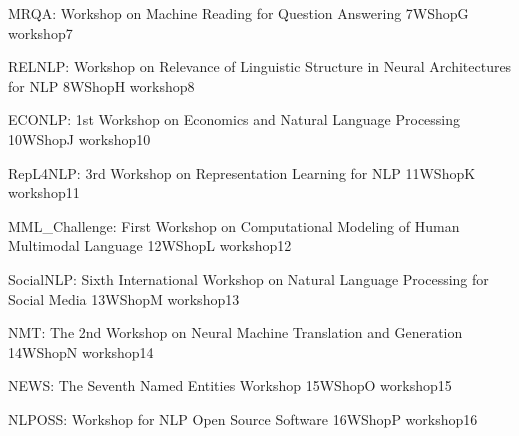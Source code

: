 \begin{wsschedule}
  {MRQA: Workshop on Machine Reading for Question Answering}
  {7}{WShopG}
  {workshop7}
  {\WShopLocG}
  
\end{wsschedule}

\begin{wsschedule}
  {RELNLP: Workshop on Relevance of Linguistic Structure in Neural 
  Architectures for NLP}
  {8}{WShopH}
  {workshop8}
  {\WShopLocH}
  
\end{wsschedule}



\begin{wsschedule}
  {ECONLP: 1st Workshop on Economics and Natural Language Processing}
  {10}{WShopJ}
  {workshop10}
  {\WShopLocJ}
  
\end{wsschedule}

\begin{wsschedule}
  {RepL4NLP: 3rd Workshop on Representation Learning for NLP}
  {11}{WShopK}
  {workshop11}
  {\WShopLocK}
  
\end{wsschedule}

\begin{wsschedule}
  {MML\_Challenge: First Workshop on Computational Modeling of Human 
  Multimodal Language}
  {12}{WShopL}
  {workshop12}
  {\WShopLocL}
  
\end{wsschedule}

\begin{wsschedule}
  {SocialNLP: Sixth International Workshop on Natural Language 
  Processing for Social Media}
  {13}{WShopM}
  {workshop13}
  {\WShopLocM}
  
\end{wsschedule}

\begin{wsschedule}
  {NMT: The 2nd Workshop on Neural Machine Translation and Generation}
  {14}{WShopN}
  {workshop14}
  {\WShopLocN}
  
\end{wsschedule}

\begin{wsschedule}
  {NEWS: The Seventh Named Entities Workshop}
  {15}{WShopO}
  {workshop15}
  {\WShopLocN}
  
\end{wsschedule}

\begin{wsschedule}
  {NLPOSS: Workshop for NLP Open Source Software}
  {16}{WShopP}
  {workshop16}
  {\WShopLocN}
  
\end{wsschedule}

\clearpage{\thispagestyle{emptyheader}\cleardoublepage}
